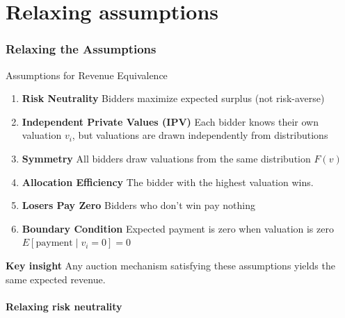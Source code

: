 \documentclass[xcolor={x11names}]{beamer}
\begin{document}
\part{Relaxing assumptions}
\section{Relaxing the Assumptions}

\begin{frame}{Assumptions for Revenue Equivalence}
\begin{enumerate}
    \item \textbf{Risk Neutrality} Bidders maximize expected surplus (not risk-averse)
    
    \item \textbf{Independent Private Values (IPV)} Each bidder knows their own valuation $v_i$, but valuations are drawn independently from distributions
    
    \item \textbf{Symmetry} All bidders draw valuations from the same distribution $F(v)$
    
    \item \textbf{Allocation Efficiency} The bidder with the highest valuation wins. 
    
    \item \textbf{Losers Pay Zero} Bidders who don't win pay nothing
    
    \item \textbf{Boundary Condition} Expected payment is zero when valuation is zero $E[\text{payment} \mid v_i = 0] = 0$
\end{enumerate}

\textbf{Key insight} Any auction mechanism satisfying these assumptions yields the same expected revenue.
\end{frame}

\subsection{Relaxing risk neutrality}
\end{document}
